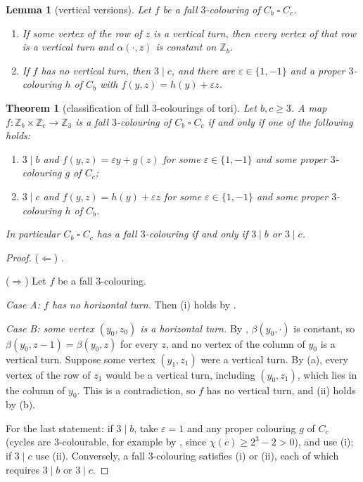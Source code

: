 \documentclass[11pt]{article}
\theoremstyle{plain}
\newtheorem{theorem}{Theorem}[section]
\newtheorem{lemma}[lemma]{Lemma}
\theoremstyle{definition}
\theoremstyle{remark}
\newcommand{\Z}{\mathbb{Z}}
\newcommand{\T}{\mathbin{\square}}
\begin{document}
\begin{lemma}[vertical versions]\label{lem:vertical}
Let $f$ be a fall $3$-colouring of $C_b \T C_c$.
\begin{enumerate}[label=(\alph*)]
  \item If some vertex of the row of $z$ is a vertical turn, then every vertex of that row is
        a vertical turn and $\alpha(\cdot, z)$ is constant on $\Z_b$.
  \item If $f$ has no vertical turn, then $3 \mid c$, and there are $\varepsilon \in \{1,-1\}$
        and a proper $3$-colouring $h$ of $C_b$ with $f(y,z) = h(y) + \varepsilon z$.
\end{enumerate}
\end{lemma}

\begin{theorem}[classification of fall $3$-colourings of tori]\label{thm:fall-classification}
Let $b, c \ge 3$. A map $f : \Z_b \times \Z_c \to \Z_3$ is a fall $3$-colouring of
$C_b \T C_c$ if and only if one of the following holds:
\begin{enumerate}[label=(\roman*)]
  \item $3 \mid b$ and $f(y,z) = \varepsilon y + g(z)$ for some $\varepsilon \in \{1,-1\}$ and
        some proper $3$-colouring $g$ of $C_c$;
  \item $3 \mid c$ and $f(y,z) = h(y) + \varepsilon z$ for some $\varepsilon \in \{1,-1\}$ and
        some proper $3$-colouring $h$ of $C_b$.
\end{enumerate}
In particular $C_b \T C_c$ has a fall $3$-colouring if and only if $3 \mid b$ or $3 \mid c$.
\end{theorem}

\begin{proof}
($\Leftarrow$) .

($\Rightarrow$) Let $f$ be a fall $3$-colouring.

\emph{Case A: $f$ has no horizontal turn.} Then (i) holds by .

\emph{Case B: some vertex $(y_0, z_0)$ is a horizontal turn.} By ,
$\beta(y_0, \cdot)$ is constant, so $\beta(y_0, z - 1) = \beta(y_0, z)$ for every $z$, and no
vertex of the column of $y_0$ is a vertical turn. Suppose some vertex $(y_1, z_1)$ were a
vertical turn. By (a), every vertex of the row of $z_1$ would be a vertical
turn, including $(y_0, z_1)$, which lies in the column of $y_0$. This is a contradiction, so
$f$ has no vertical turn, and (ii) holds by (b).

For the last statement: if $3 \mid b$, take $\varepsilon = 1$ and any proper colouring $g$ of
$C_c$ (cycles are $3$-colourable, for example by , since
$\chi(c) \ge 2^3 - 2 > 0$), and use (i); if $3 \mid c$ use (ii). Conversely, a fall
$3$-colouring satisfies (i) or (ii), each of which requires $3 \mid b$ or $3 \mid c$.
\end{proof}
\end{document}
